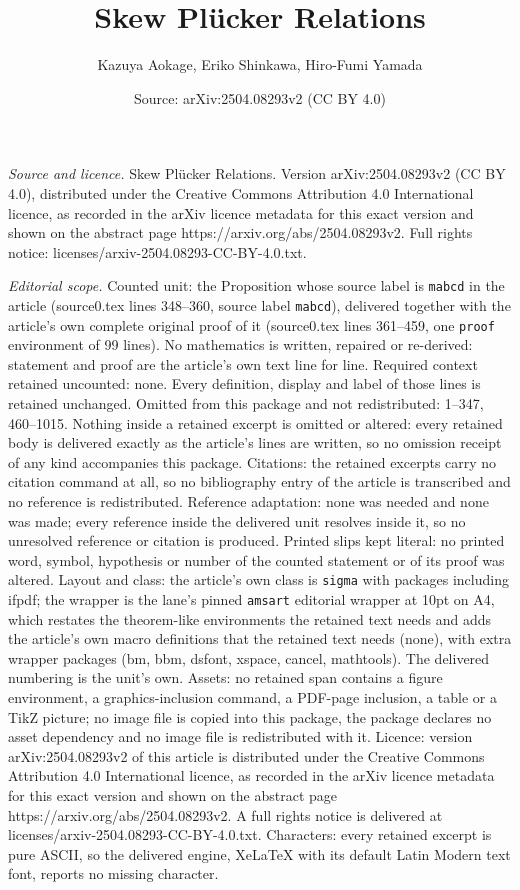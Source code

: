\documentclass[10pt,a4paper]{amsart}
\title[Skew Pl\"ucker Relations]{Skew Pl\"ucker Relations}
\author{Kazuya Aokage, Eriko Shinkawa, Hiro-Fumi Yamada}
\date{Source: arXiv:2504.08293v2 (CC BY 4.0)}
\begin{document}
\maketitle

\noindent\emph{Source and licence.} Skew Pl\"ucker Relations. Version arXiv:2504.08293v2 (CC BY 4.0), distributed under the Creative Commons Attribution 4.0 International licence, as recorded in the arXiv licence metadata for this exact version and shown on the abstract page https://arxiv.org/abs/2504.08293v2. Full rights notice: licenses/arxiv-2504.08293-CC-BY-4.0.txt.\par\smallskip

\noindent\textit{Editorial scope.} Counted unit: the Proposition whose source label is \texttt{mabcd} in the article (source0.tex lines 348--360, source label \texttt{mabcd}), delivered together with the article's own complete original proof of it (source0.tex lines 361--459, one \texttt{proof} environment of 99 lines). No mathematics is written, repaired or re-derived: statement and proof are the article's own text line for line. Required context retained uncounted: none. Every definition, display and label of those lines is retained unchanged. Omitted from this package and not redistributed: 1--347, 460--1015. Nothing inside a retained excerpt is omitted or altered: every retained body is delivered exactly as the article's lines are written, so no omission receipt of any kind accompanies this package. Citations: the retained excerpts carry no citation command at all, so no bibliography entry of the article is transcribed and no reference is redistributed. Reference adaptation: none was needed and none was made; every reference inside the delivered unit resolves inside it, so no unresolved reference or citation is produced. Printed slips kept literal: no printed word, symbol, hypothesis or number of the counted statement or of its proof was altered. Layout and class: the article's own class is \texttt{sigma} with packages including ifpdf; the wrapper is the lane's pinned \texttt{amsart} editorial wrapper at 10pt on A4, which restates the theorem-like environments the retained text needs and adds the article's own macro definitions that the retained text needs (none), with extra wrapper packages (bm, bbm, dsfont, xspace, cancel, mathtools). The delivered numbering is the unit's own. Assets: no retained span contains a figure environment, a graphics-inclusion command, a PDF-page inclusion, a table or a TikZ picture; no image file is copied into this package, the package declares no asset dependency and no image file is redistributed with it. Licence: version arXiv:2504.08293v2 of this article is distributed under the Creative Commons Attribution 4.0 International licence, as recorded in the arXiv licence metadata for this exact version and shown on the abstract page https://arxiv.org/abs/2504.08293v2. A full rights notice is delivered at licenses/arxiv-2504.08293-CC-BY-4.0.txt. Characters: every retained excerpt is pure ASCII, so the delivered engine, XeLaTeX with its default Latin Modern text font, reports no missing character.
\end{document}
